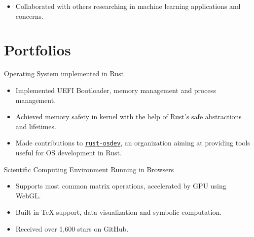 \documentclass{resume}
\newcommand{\en}[1]{#1}
\newcommand{\zh}[1]{}
\begin{document}
\en{}
\zh{\datedsubsection{\textbf{英国剑桥大学人工智能暑期交流项目}}{2018/07 -- 2018/08}}
\en{}
\zh{\role{学生}{暑期交流}}
\begin{itemize}
      \item \en{Collaborated with others researching in machine learning applications and concerns.}
            \zh{在小组中担任领导角色，研究机器学习应用问题，负责了小组展示的选题与组织。}
\end{itemize}

\section{\en{Portfolios}\zh{个人项目}}
\en{Operating System implemented in Rust}
\zh{使用 Rust 编写的操作系统}
\begin{itemize}
      \item \en{Implemented UEFI Bootloader, memory management and process management.}
            \zh{实现了 UEFI Bootloader 、内存管理与进程管理。}
      \item \en{Achieved memory safety in kernel with the help of Rust's safe abstractions and lifetimes.}
            \zh{借助 Rust 的抽象能力与生命周期概念实现内核中的内存安全。}
      \item \en{Made contributions to \texttt{\href{https://github.com/rust-osdev}{rust-osdev}}, an organization aiming at providing tools useful for OS development in Rust.}
            \zh{为 Rust 操作系统开源组织 \texttt{\href{https://github.com/rust-osdev}{rust-osdev}} 贡献代码。}
\end{itemize}

\en{Scientific Computing Environment Running in Browsers}
\zh{完全在浏览器中运行的科学计算环境}
\begin{itemize}
      \item \en{Supports most common matrix operations, accelerated by GPU using WebGL.}
            \zh{支持大部分矩阵操作，并基于 WebGL 实现计算加速。}
      \item \en{Built-in TeX support, data visualization and symbolic computation.}
            \zh{内建 TeX 公式支持、数据可视化及符号计算。}
      \item \en{Received over 1,600 stars on GitHub.}
            \zh{在 GitHub 上收到超过 1,600 个 star。}
\end{itemize}
\end{document}
